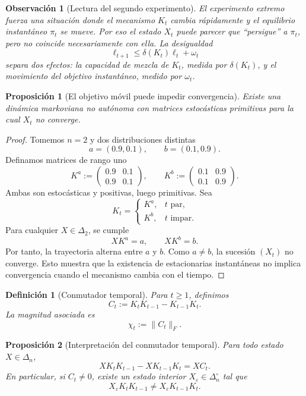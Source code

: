 \documentclass[12pt]{article}
\newtheorem{definicion}{Definición}[section]
\newtheorem{proposicion}{Proposición}[section]
\newtheorem{observacion}{Observación}[section]
\begin{document}
\begin{observacion}[Lectura del segundo experimento]
El experimento extremo fuerza una situación donde el mecanismo \(K_t\) cambia
rápidamente y el equilibrio instantáneo \(\pi_t\) se mueve. Por eso el estado
\(X_t\) puede parecer que ``persigue'' a \(\pi_t\), pero no coincide
necesariamente con ella. La desigualdad
\[
\ell_{t+1}\leq \delta(K_t)\ell_t+\omega_t
\]
separa dos efectos: la capacidad de mezcla de \(K_t\), medida por
\(\delta(K_t)\), y el movimiento del objetivo instantáneo, medido por
\(\omega_t\).
\end{observacion}

\begin{proposicion}[El objetivo móvil puede impedir convergencia]
Existe una dinámica markoviana no autónoma con matrices estocásticas primitivas
para la cual \(X_t\) no converge.
\end{proposicion}

\begin{proof}
Tomemos \(n=2\) y dos distribuciones distintas
\[
a=(0.9,0.1),
\qquad
b=(0.1,0.9).
\]
Definamos matrices de rango uno
\[
K^{a}:=
\begin{pmatrix}
0.9 & 0.1\\
0.9 & 0.1
\end{pmatrix},
\qquad
K^{b}:=
\begin{pmatrix}
0.1 & 0.9\\
0.1 & 0.9
\end{pmatrix}.
\]
Ambas son estocásticas y positivas, luego primitivas. Sea
\[
K_t=
\begin{cases}
K^{a}, & t\text{ par},\\
K^{b}, & t\text{ impar}.
\end{cases}
\]
Para cualquier \(X\in\Delta_2\), se cumple
\[
XK^{a}=a,
\qquad
XK^{b}=b.
\]
Por tanto, la trayectoria alterna entre \(a\) y \(b\). Como \(a\neq b\), la
sucesión \((X_t)\) no converge. Esto muestra que la existencia de estacionarias
instantáneas no implica convergencia cuando el mecanismo cambia con el tiempo.
\end{proof}

\begin{definicion}[Conmutador temporal]
Para \(t\geq 1\), definimos
\[
C_t:=K_tK_{t-1}-K_{t-1}K_t.
\]
La magnitud asociada es
\[
\chi_t:=\|C_t\|_F.
\]
\end{definicion}

\begin{proposicion}[Interpretación del conmutador temporal]
Para todo estado \(X\in\Delta_n\),
\[
XK_tK_{t-1}-XK_{t-1}K_t
=
XC_t.
\]
En particular, si \(C_t\neq 0\), existe un estado interior
\(X_\varepsilon\in\Delta_n^\circ\) tal que
\[
X_\varepsilon K_tK_{t-1}
\neq
X_\varepsilon K_{t-1}K_t.
\]
\end{proposicion}
\end{document}
